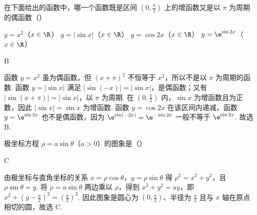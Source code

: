 \begin{problem}

在下面给出的函数中，哪一个函数既是区间 \(\left(0, \frac{\pi}{2}\right)\) 上的增函数又是以 \(\pi\) 为周期的偶函数（\quad）

\choices
    {\(y = x^{2}\)（\(x\in \R\)）}
    {\(y = |\sin x|\)（\(x\in \R\)）}
    {\(y = \cos 2x\)（\(x\in \R\)）}
    {\(y = \e^{\sin 2x}\)（\(x \in \R\)）}

\begin{answer}
B
\end{answer}

\begin{solution}
函数 \(y=x^2\) 虽为偶函数，但 \((x+\pi)^2\) 不恒等于 \(x^2\)，所以不是以 \(\pi\) 为周期的函数. 函数 \(y=|\sin x|\) 满足 \(|\sin(-x)|=|\sin x|\)，是偶函数；又有 \(|\sin(x+\pi)|=|\sin x|\)，以 \(\pi\) 为周期. 在 \(\left(0,\frac{\pi}{2}\right)\) 内，\(\sin x\) 为增函数且为正数，因此 \(|\sin x|=\sin x\) 为增函数. 函数 \(y=\cos 2x\) 在该区间内递减，函数 \(y=\e^{\sin 2x}\) 也不是偶函数，因为 \(\e^{\sin(-2x)}=\e^{-\sin 2x}\) 一般不等于 \(\e^{\sin 2x}\). 故选 B.
\end{solution}
\end{problem}

\begin{problem}

极坐标方程 \(\rho = a\sin \theta\)（\(a > 0\)）的图象是（\quad）

    {}
    {}
    {}

\begin{answer}
C
\end{answer}

\begin{solution}
由极坐标与直角坐标的关系 \(x=\rho\cos\theta\)，\(y=\rho\sin\theta\) 得 \(\rho^2=x^2+y^2\)，且 \(\rho\sin\theta=y\). 将 \(\rho=a\sin\theta\) 两边乘以 \(\rho\)，得到 \(x^2+y^2=ay\)，即 \(x^2+\left(y-\frac{a}{2}\right)^2=\left(\frac{a}{2}\right)^2\). 因此图象是圆心为 \(\left(0,\frac{a}{2}\right)\)、半径为 \(\frac{a}{2}\) 且与 \(x\) 轴在原点相切的圆，故选 C.
\end{solution}
\end{problem}


